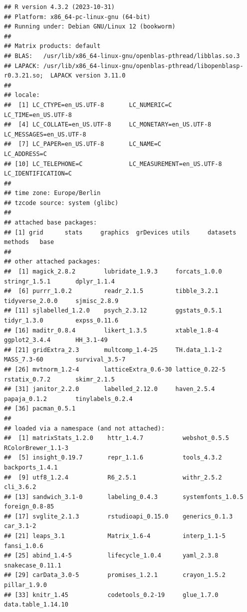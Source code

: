 \documentclass[
  doc]{apa6}
\begin{document}
\begin{verbatim}
## R version 4.3.2 (2023-10-31)
## Platform: x86_64-pc-linux-gnu (64-bit)
## Running under: Debian GNU/Linux 12 (bookworm)
## 
## Matrix products: default
## BLAS:   /usr/lib/x86_64-linux-gnu/openblas-pthread/libblas.so.3 
## LAPACK: /usr/lib/x86_64-linux-gnu/openblas-pthread/libopenblasp-r0.3.21.so;  LAPACK version 3.11.0
## 
## locale:
##  [1] LC_CTYPE=en_US.UTF-8       LC_NUMERIC=C               LC_TIME=en_US.UTF-8       
##  [4] LC_COLLATE=en_US.UTF-8     LC_MONETARY=en_US.UTF-8    LC_MESSAGES=en_US.UTF-8   
##  [7] LC_PAPER=en_US.UTF-8       LC_NAME=C                  LC_ADDRESS=C              
## [10] LC_TELEPHONE=C             LC_MEASUREMENT=en_US.UTF-8 LC_IDENTIFICATION=C       
## 
## time zone: Europe/Berlin
## tzcode source: system (glibc)
## 
## attached base packages:
## [1] grid      stats     graphics  grDevices utils     datasets  methods   base     
## 
## other attached packages:
##  [1] magick_2.8.2        lubridate_1.9.3     forcats_1.0.0       stringr_1.5.1       dplyr_1.1.4        
##  [6] purrr_1.0.2         readr_2.1.5         tibble_3.2.1        tidyverse_2.0.0     sjmisc_2.8.9       
## [11] sjlabelled_1.2.0    psych_2.3.12        ggstats_0.5.1       tidyr_1.3.0         expss_0.11.6       
## [16] maditr_0.8.4        likert_1.3.5        xtable_1.8-4        ggplot2_3.4.4       HH_3.1-49          
## [21] gridExtra_2.3       multcomp_1.4-25     TH.data_1.1-2       MASS_7.3-60         survival_3.5-7     
## [26] mvtnorm_1.2-4       latticeExtra_0.6-30 lattice_0.22-5      rstatix_0.7.2       skimr_2.1.5        
## [31] janitor_2.2.0       labelled_2.12.0     haven_2.5.4         papaja_0.1.2        tinylabels_0.2.4   
## [36] pacman_0.5.1       
## 
## loaded via a namespace (and not attached):
##  [1] matrixStats_1.2.0    httr_1.4.7           webshot_0.5.5        RColorBrewer_1.1-3  
##  [5] insight_0.19.7       repr_1.1.6           tools_4.3.2          backports_1.4.1     
##  [9] utf8_1.2.4           R6_2.5.1             withr_2.5.2          cli_3.6.2           
## [13] sandwich_3.1-0       labeling_0.4.3       systemfonts_1.0.5    foreign_0.8-85      
## [17] svglite_2.1.3        rstudioapi_0.15.0    generics_0.1.3       car_3.1-2           
## [21] leaps_3.1            Matrix_1.6-4         interp_1.1-5         fansi_1.0.6         
## [25] abind_1.4-5          lifecycle_1.0.4      yaml_2.3.8           snakecase_0.11.1    
## [29] carData_3.0-5        promises_1.2.1       crayon_1.5.2         pillar_1.9.0        
## [33] knitr_1.45           codetools_0.2-19     glue_1.7.0           data.table_1.14.10  

\end{verbatim}
\end{document}
